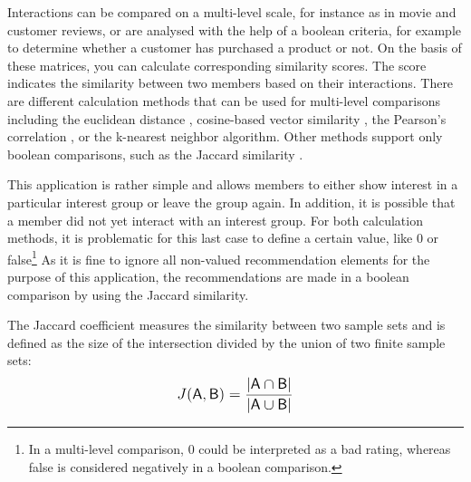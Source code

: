 \documentclass[12pt,numbers=noenddot,parskip,bibliography=totocnumbered,listof=totocnumbered,draft]{scrreprt}
\begin{document}
Interactions can be compared on a multi-level scale, for instance as in movie and customer reviews, or are analysed with the help of a boolean criteria, for example to determine whether a customer has purchased a product or not. On the basis of these matrices, you can calculate corresponding similarity scores. The score indicates the similarity between two members based on their interactions. There are different calculation methods that can be used for multi-level comparisons including the euclidean distance \citep[p.75]{klahold2009}, cosine-based vector similarity \citep[p.71]{klahold2009}, the Pearson's correlation \citep[p.72]{klahold2009}, or the k-nearest neighbor \citep[p.76]{klahold2009} algorithm. Other methods support only boolean comparisons, such as the Jaccard similarity \citep[p.74]{klahold2009}. 

This application is rather simple and allows members to either show interest in a particular interest group or leave the group again. In addition, it is possible that a member did not yet interact with an interest group. For both calculation methods, it is problematic for this last case to define a certain value, like 0 or false\footnote{In a multi-level comparison, 0 could be interpreted as a bad rating, whereas false is considered negatively in a boolean comparison.} As it is fine to ignore all non-valued recommendation elements for the purpose of this application, the recommendations are made in a boolean comparison by using the Jaccard similarity. 

The Jaccard coefficient measures the similarity between two sample sets and is defined as the size of the intersection divided by the union of two finite sample sets:
\[
\mathlarger{J(\mathsf{A}, \mathsf{B}) = \frac{|\mathsf{A} \cap \mathsf{B}|}{|\mathsf{A} \cup \mathsf{B}|}}
\] 
\end{document}
